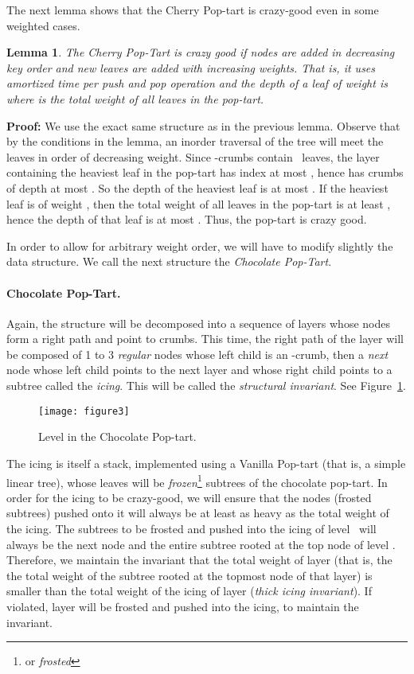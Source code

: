 \documentclass[11pt]{article}
\newtheorem{lemma}[theorem]{Lemma}
\newenvironment{proof}{\noindent\textbf{Proof: }\ignorespaces}
  {\hspace*{\fill}\medskip}
\begin{document}
The next lemma shows that the Cherry Pop-tart is crazy-good even in
some weighted cases. 
\begin{lemma}\label{lem:cherry-pop-tart}
The Cherry Pop-Tart is crazy good if nodes are added in decreasing
key order and new leaves are added with increasing weights.
That is, it uses  amortized time per push and pop operation and
the depth of a leaf of weight  is  where  is the
total weight of all leaves in the pop-tart.
\end{lemma}
\begin{proof}
We use the exact same structure as in the previous lemma. Observe that
by the conditions in the lemma, an inorder traversal of the tree will
meet the leaves in order of decreasing weight. Since -crumbs
contain~ leaves, the layer containing the  heaviest leaf in
the pop-tart has index at most , hence has crumbs of depth at
most . So the depth of the  heaviest leaf is at most
. If the  heaviest leaf is of weight , then the
total weight  of all leaves in the pop-tart is at least , hence
the depth of that leaf is at most . Thus, the
pop-tart is crazy good.
\end{proof}

In order to allow for arbitrary weight order, we will have to modify
slightly the data structure. We call the next structure the
\emph{Chocolate Pop-Tart}.

\paragraph{Chocolate Pop-Tart.}
Again, the structure will be decomposed into a sequence of layers whose
nodes form a right path and point to crumbs. This time, the right path
of the  layer will be composed of 1 to 3 \emph{regular} nodes
whose left child is an -crumb, then a \emph{next} node whose left
child points to the next layer and whose right child points to a subtree
called the \emph{icing}. This will be called the \emph{structural invariant}.  See Figure~\ref{fig:chocoloate-pop-tart}.
\begin{figure}
\begin{center}
\texttt{[image: figure3]} 
\end{center}
\caption{Level  in the Chocolate Pop-tart.}
\label{fig:chocoloate-pop-tart}
\end{figure} 
The icing is itself a stack, implemented using a Vanilla Pop-tart (that
is, a simple linear tree), whose leaves will be
\emph{frozen}\footnote{or \emph{frosted}} subtrees of the chocolate
pop-tart. In order for the icing to be crazy-good, we will ensure that
the nodes (frosted subtrees) pushed onto it will always be at least as
heavy as the total weight of the icing.  The subtrees to be frosted and
pushed into the icing of level~ will always be the next node and the
entire subtree rooted at the top node of level .  Therefore, we
maintain the invariant that the total weight of layer  (that is,
the the total weight of the subtree rooted at the topmost node of that
layer) is smaller than the total weight of the icing of layer 
(\emph{thick icing invariant}). If
violated, layer  will be frosted and pushed into the icing, to
maintain the invariant.
\end{document}
